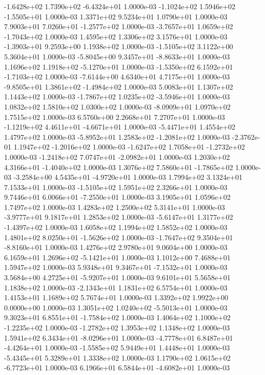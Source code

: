 -1.6428e+02  1.7390e+02 -6.4324e+01  1.0000e-03
-1.1024e+02  1.5946e+02 -1.5505e+01  1.0000e-03
1.3371e+02 9.5234e+01 1.0790e+01  1.0000e-03
 7.9003e+01  7.0260e+01 -1.2577e+02  1.0000e-03
-3.7657e+01  1.0659e+02 -1.7043e+02  1.0000e-03
1.4595e+02 1.3306e+02 3.1576e+01  1.0000e-03
-1.3903e+01  9.2593e+00  1.1938e+02  1.0000e-03
-1.5105e+02  3.1122e+00  5.3604e+01  1.0000e-03
-5.8045e+00  9.3457e+01 -8.8633e+01  1.0000e-03
 1.1696e+02  1.1918e+02 -5.1270e+01  1.0000e-03
-1.5350e+02  6.1592e+01 -1.7103e+02  1.0000e-03
-7.6144e+00  4.6340e+01  4.7175e+01  1.0000e-03
-9.8505e+01  1.3861e+02 -1.4984e+02  1.0000e-03
5.0083e+01 1.1307e+02 1.1443e+02  1.0000e-03
-1.7867e+02  1.0235e+02 -3.5946e+01  1.0000e-03
1.0832e+02 1.5810e+02 1.0300e+02  1.0000e-03
-8.0909e+01  1.0970e+02  1.7515e+02  1.0000e-03
6.5760e+00 2.2668e+01 7.2707e+01  1.0000e-03
-1.1219e+02  4.4611e+01 -4.6671e+01  1.0000e-03
-5.4471e+01  1.4554e+02  1.4797e+02  1.0000e-03
-5.8952e+01  1.2583e+02 -1.2081e+02  1.0000e-03
-2.3762e-01  1.1947e+02 -1.2016e+02  1.0000e-03
-1.6247e+02  1.7058e+01 -1.2732e+02  1.0000e-03
-1.2418e+02  7.0747e+01 -2.0982e+01  1.0000e-03
 1.2030e+02  4.3166e+01 -1.4040e+02  1.0000e-03
 1.3076e+02  7.5860e+01 -1.7865e+02  1.0000e-03
-3.2584e+00  4.5435e+01 -4.9720e+01  1.0000e-03
1.7994e+02 3.1324e+01 7.1533e+01  1.0000e-03
-1.5105e+02  1.5951e+02  2.3266e+01  1.0000e-03
 9.7446e+01  6.0066e+01 -7.2550e+01  1.0000e-03
3.1905e+01 1.0596e+02 1.7497e+02  1.0000e-03
1.4283e+02 1.2500e+02 5.3141e+01  1.0000e-03
-3.9777e+01  9.1817e+01  1.2853e+02  1.0000e-03
-5.6147e+01  1.3177e+02 -1.4397e+02  1.0000e-03
1.6058e+02 1.1994e+02 1.5852e+02  1.0000e-03
 1.4801e+02  8.0250e+01 -1.5626e+02  1.0000e-03
-1.7647e+02  9.3504e+01 -8.8160e+01  1.0000e-03
1.4276e+02 2.9780e+01 9.0604e+00  1.0000e-03
 6.1659e+01  1.2696e+02 -5.1421e+01  1.0000e-03
1.1012e+00 7.4688e+01 1.5947e+02  1.0000e-03
 5.9348e+01  9.3467e+01 -7.1532e+01  1.0000e-03
 3.5684e+00  4.2725e+01 -5.9207e+01  1.0000e-03
9.6101e+01 5.5658e+01 1.1838e+02  1.0000e-03
-2.1343e+01  1.1831e+02  6.5754e+01  1.0000e-03
1.4153e+01 1.1689e+02 5.7674e+01  1.0000e-03
1.3392e+02 1.9922e+00 0.0000e+00  1.0000e-03
 1.3051e+02  1.0240e+02 -5.5013e+01  1.0000e-03
 9.3023e+01  6.8551e+01 -1.7584e+02  1.0000e-03
 1.4064e+02  1.1000e+02 -1.2235e+02  1.0000e-03
-1.2782e+02  1.3953e+02  1.1348e+02  1.0000e-03
 1.5941e+02  6.3434e+01 -8.0296e+01  1.0000e-03
-4.7778e+01  6.8487e+01 -4.4264e+01  1.0000e-03
-1.5585e+02  5.9449e+01  1.4448e+01  1.0000e-03
-5.4345e+01  5.3289e+01  1.3338e+02  1.0000e-03
 1.1790e+02  1.0615e+02 -6.7723e+01  1.0000e-03
 6.1966e+01  6.5844e+01 -4.6082e+01  1.0000e-03
